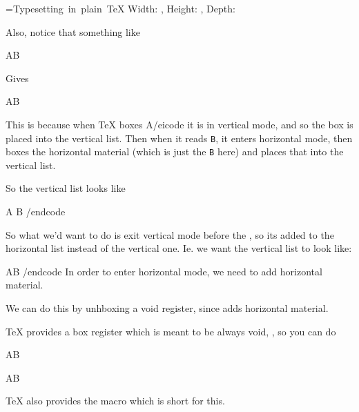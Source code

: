 {{    \textbox{}
        =\hbox{Typesetting in plain \TeX}
        Width: \the{}, Height: \the{}, Depth: \the{}
    \endtextbox

    \textbox\empty{1cm}{\lastey+.5cm}{\hsize-2cm}{}
        Also, notice that something like

\beginhi
\hbox{A}B
\endhi

        Gives
    \endtextbox

    \textbox{}
        \hbox{A}B
    \endtextbox

    \textbox\empty{1cm}{\lastey+5pt}{\hsize-2cm}{}
        This is because when \TeX{} boxes \icode \hbox{A}/eicode{} it is in vertical mode, and so the box is placed into the
        vertical list.
        Then when it reads {\tt B}, it enters horizontal mode, then boxes the horizontal material (which is just the {\tt B} here)
        and places that into the vertical list.
    \endtextbox

\endslide

\beginslide
    \bheadline

    \textbox\empty{1cm}{2cm}{\hsize-2cm}{}
        So the vertical list looks like

\begincode
\vbox{
    \hbox{A}
    \hbox{B}
}
/endcode

        So what we'd want to do is exit vertical mode before the \macroname\hbox, so its added to the horizontal list instead
        of the vertical one.
        Ie. we want the vertical list to look like:

\begincode
\vbox{
    \hbox{\hbox{A}B}
}
/endcode
        In order to enter horizontal mode, we need to add horizontal material.

        We can do this by unhboxing a void register, since \macroname\unhbox{} adds horizontal material.

        \TeX{} provides a box register which is meant to be always void, \macroname\voidb@x, so you can do

\beginhi
\unhbox\voidb@x\hbox{A}B
\endhi
    \endtextbox

    \textbox{}
        \unhbox\voidb@x\hbox{A}B
    \endtextbox

    \textbox\empty{1cm}{\lastey+5pt}{\hsize-2cm}{}
        \TeX{} also provides the macro \macroname\leavevmode{} which is short for this.

}}
